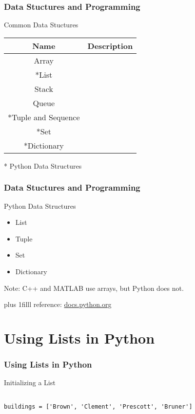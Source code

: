 \documentclass[fleqn]{beamer} %
\newcommand{\sectiontitleI}{Data Stuctures and Programming} %
\newcommand{\sectiontitleII}{Using Lists in Python}
\newcommand{\btVFill}{\vskip0pt plus 1filll}
\begin{document}
	\begin{frame} \small
		\frametitle{\sectiontitleI}

		Common Data Stuctures 
		\renewcommand{\arraystretch}{1.5}
		\begin{tabular}{|c|c|} \hline
			Name& Description \hspace{50mm} \\ \hline
			Array&  \\ \hline
			*List&  \\ \hline
			Stack&  \\ \hline
			Queue&  \\ \hline
			*Tuple and Sequence&  \\ \hline
			*Set&  \\ \hline
			*Dictionary&  \\ \hline
		\end{tabular}

		* Python Data Structures
	\end{frame}
		

	\begin{frame} \small
		\frametitle{\sectiontitleI}

		Python Data Structures

		\begin{itemize}
			\item List
			\item Tuple
			\item Set
			\item Dictionary
		\end{itemize}

		Note: C++ and MATLAB use arrays, but Python does not.



		\btVFill
		\tiny{reference: \href{https://docs.python.org/3/tutorial/datastructures.html\#}{docs.python.org} } 
	\end{frame}


\section{\sectiontitleII}

	\begin{frame}[label=sectionII, containsverbatim] \small
		\frametitle{\sectiontitleII}
			
		Initializing a List

		\begin{lstlisting}

buildings = ['Brown', 'Clement', 'Prescott', 'Bruner']

		\end{lstlisting}

	
	\end{frame}
\end{document}

